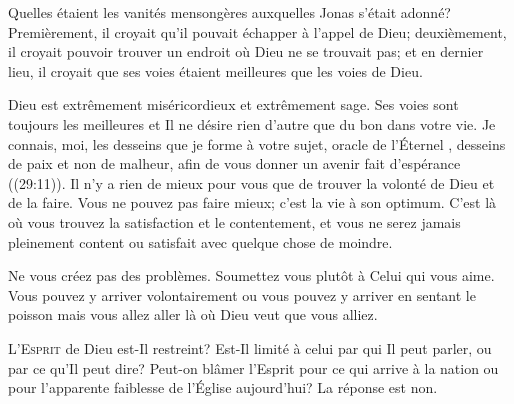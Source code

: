Quelles étaient les vanités mensongères auxquelles Jonas s'était adonné?
 Premièrement, il croyait qu'il pouvait échapper à l'appel de Dieu;
 deuxièmement, il croyait pouvoir trouver un endroit où Dieu
 ne se trouvait pas; et en dernier lieu, il croyait que ses voies
 étaient meilleures que les voies de Dieu. 


Dieu est extrêmement miséricordieux et extrêmement sage.
 Ses voies sont toujours les meilleures et Il ne désire rien d'autre
 que du bon dans votre vie.
 \Og Je connais, moi, les desseins que je forme à votre sujet,
 \ocadr oracle de l'Éternel \fcadr{}, desseins de paix et non de malheur,
 afin de vous donner un avenir fait d'espérance \Fg{} ((29:11)).
 Il n'y a rien de mieux pour vous que de trouver la volonté de Dieu
 et de la faire. Vous ne pouvez pas faire mieux; c'est la vie à son optimum.
 C'est là où vous trouvez la satisfaction et le contentement,
 et vous ne serez jamais pleinement content ou satisfait
 avec quelque chose de moindre. 

Ne vous créez pas des problèmes. Soumettez vous plutôt à Celui qui vous aime.
 Vous pouvez y arriver volontairement ou vous pouvez y arriver en sentant
 le poisson \ocadr mais vous allez aller 
 là où Dieu veut que vous alliez. 

\dvrule






\lettrine{L}{'Esprit} de Dieu est-Il restreint?
 Est-Il limité à celui par qui Il peut parler, ou par ce qu'Il peut dire?
 Peut-on blâmer l'Esprit pour ce qui arrive à la nation
 ou pour l'apparente faiblesse de l'Église aujourd'hui? La réponse est non. 


